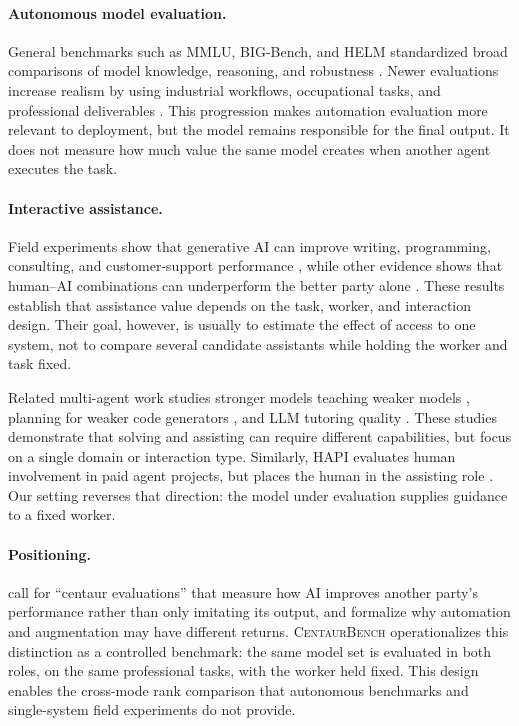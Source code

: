 \paragraph{Autonomous model evaluation.}
General benchmarks such as MMLU, BIG-Bench, and HELM standardized broad
comparisons of model knowledge, reasoning, and robustness
\citep{hendrycks2021,srivastava2023,liang2023}. Newer evaluations increase
realism by using industrial workflows, occupational tasks, and professional
deliverables \citep{sopbench2025,gdpval2025,profbench2025,occubench2026,
jobbench2026}. This progression makes automation evaluation more relevant to
deployment, but the model remains responsible for the final output. It does
not measure how much value the same model creates when another agent executes
the task.

\paragraph{Interactive assistance.}
Field experiments show that generative AI can improve writing, programming,
consulting, and customer-support performance
\citep{noy2023,peng2023,dellacqua2023,brynjolfsson2025}, while other evidence
shows that human--AI combinations can underperform the better party alone
\citep{vaccaro2024}. These results establish that assistance value depends on
the task, worker, and interaction design. Their goal, however, is usually to
estimate the effect of access to one system, not to compare several candidate
assistants while holding the worker and task fixed.

Related multi-agent work studies stronger models teaching weaker models
\citep{saha2023}, planning for weaker code generators \citep{gandhi2025}, and
LLM tutoring quality \citep{macina2025}. These studies demonstrate that
solving and assisting can require different capabilities, but focus on a
single domain or interaction type. Similarly, HAPI evaluates human involvement
in paid agent projects, but places the human in the assisting role
\citep{upwork_hapi2025}. Our setting reverses that direction: the model under
evaluation supplies guidance to a fixed worker.

\paragraph{Positioning.}
\citet{haupt2025} call for ``centaur evaluations'' that measure how AI
improves another party's performance rather than only imitating its output,
and \citet{fugener2026} formalize why automation and augmentation may have
different returns. \textsc{CentaurBench} operationalizes this distinction as
a controlled benchmark: the same model set is evaluated in both roles, on the
same professional tasks, with the worker held fixed. This design enables the
cross-mode rank comparison that autonomous benchmarks and single-system field
experiments do not provide.
